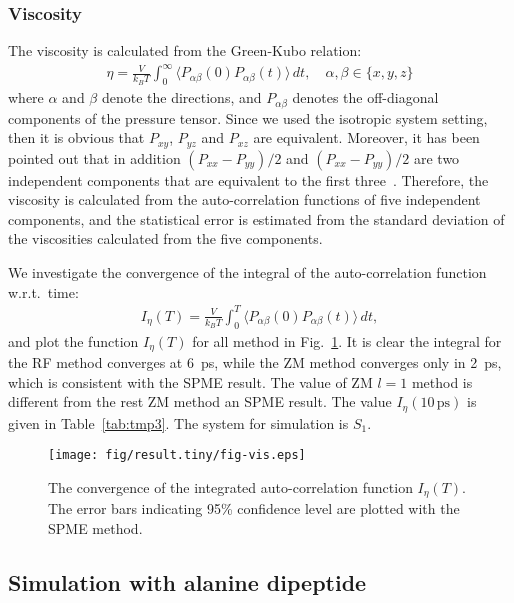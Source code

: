 \documentclass[aip,jcp,a4paper,reprint,unsortedaddress,onecolumn,fleqn]{revtex4-1}
\newcommand{\systemsb}{S_1}
\begin{document}
\subsubsection{Viscosity}
The viscosity is calculated from the Green-Kubo relation:
\begin{align}
  \eta = \frac{V}{k_BT}\int_0^\infty\langle P_{\alpha\beta}(0) P_{\alpha\beta}(t)\rangle\,dt, \quad \alpha,\beta \in \{x, y, z\}
\end{align}
where $\alpha$ and $\beta$ denote the directions, and
$P_{\alpha\beta}$ denotes the off-diagonal components of the pressure
tensor. Since we used the isotropic system setting, then it is obvious
that $P_{xy}$, $P_{yz}$ and $P_{xz}$ are equivalent. Moreover, it has
been pointed out that in addition $(P_{xx} - P_{yy})/2$ and $(P_{xx} -
P_{yy})/2$ are two independent components that are equivalent to the
first three~\cite{alfe1998first}. Therefore, the viscosity is
calculated from the auto-correlation functions of five independent
components, and the statistical error is estimated from the standard
deviation of the viscosities calculated from the five components.

We investigate the convergence of the integral of the auto-correlation function w.r.t.~time:
\begin{align}
  I_\eta(T) = \frac{V}{k_BT}\int_0^T\langle P_{\alpha\beta}(0) P_{\alpha\beta}(t)\rangle\,dt,
\end{align}
and plot the function $I_\eta(T) $ for all method in
Fig.~\ref{fig:tmp4}.  It is clear the integral for the RF method
converges at 6~ps, while the ZM method converges only in 2~ps, which
is consistent with the SPME result.  The value of ZM $l=1$ method is
different from the rest ZM method an SPME result.  The value
$I_\eta(10\,\textrm{ps})$ is given in Table~\ref{tab:tmp3}.  The
system for simulation is $\systemsb$.

\begin{figure}
  \centering
  \texttt{[image: fig/result.tiny/fig-vis.eps]}
  \caption{The convergence of the integrated auto-correlation function $I_\eta(T) $. The error bars indicating 95\% confidence level are plotted with the SPME method.}
  \label{fig:tmp4}
\end{figure}




\subsection{Simulation with alanine dipeptide}
\end{document}
